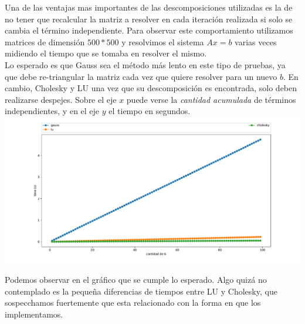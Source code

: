 Una de las ventajas mas importantes de las descomposiciones utilizadas es la de no tener que recalcular la matriz a resolver en cada iteración realizada si solo se cambia el término independiente. Para observar este comportamiento utilizamos matrices de dimensión $500*500$ y resolvimos el sistema $Ax = b$ varias veces midiendo el tiempo que se tomaba en resolver el mismo. \\

Lo esperado es que Gauss sea el método más lento en este tipo de pruebas, ya que debe re-triangular la matriz cada vez que quiere resolver para un nuevo $b$. En cambio, Cholesky y LU una vez que su descomposición es encontrada, solo deben realizarse despejes. Sobre el eje $x$ puede verse la \textit{cantidad acumulada} de términos independientes, y en el eje $y$ el tiempo en segundos. \\
\hspace*{-2cm} \includegraphics[scale=0.55]{informe/imagenes/tytalus/DistintosBSuma-Dim500.pdf}

Podemos observar en el gráfico que se cumple lo esperado. Algo quizá no contemplado es la pequeña diferencias de tiempos entre LU y Cholesky, que sospecchamos fuertemente que esta relacionado con la forma en que los implementamos.





